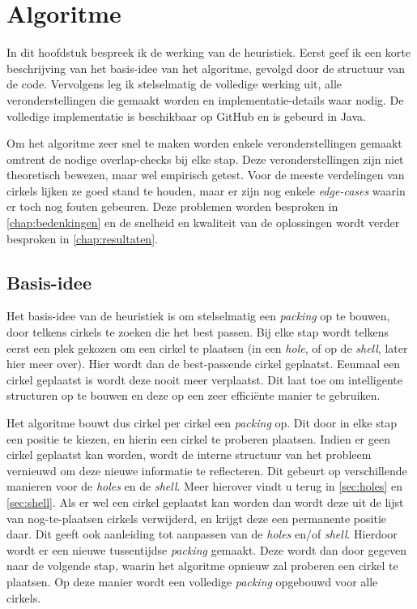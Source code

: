 \documentclass[12pt,a4paper,oneside]{book}
\begin{document}
\chapter{Algoritme} \label{chap:algoritme}

In dit hoofdstuk bespreek ik de werking van de heuristiek.
Eerst geef ik een korte beschrijving van het basis-idee van het algoritme, gevolgd door de structuur van de code.
Vervolgens leg ik stelselmatig de volledige werking uit, alle veronderstellingen die gemaakt worden en implementatie-details waar nodig.
De volledige implementatie is beschikbaar op GitHub \cite{circle-packing-github} en is gebeurd in Java.

Om het algoritme zeer snel te maken worden enkele veronderstellingen gemaakt omtrent de nodige overlap-checks bij elke stap.
Deze veronderstellingen zijn niet theoretisch bewezen, maar wel empirisch getest.
Voor de meeste verdelingen van cirkels lijken ze goed stand te houden, maar er zijn nog enkele \textit{edge-cases} waarin er toch nog fouten gebeuren.
Deze problemen worden besproken in \autoref{chap:bedenkingen} en de snelheid en kwaliteit van de oplossingen wordt verder besproken in \autoref{chap:resultaten}.

\section{Basis-idee}

Het basis-idee van de heuristiek is om stelselmatig een \textit{packing} op te bouwen, door telkens cirkels te zoeken die het best passen.
Bij elke stap wordt telkens eerst een plek gekozen om een cirkel te plaatsen (in een \textit{hole}, of op de \textit{shell}, later hier meer over).
Hier wordt dan de best-passende cirkel geplaatst.
Eenmaal een cirkel geplaatst is wordt deze nooit meer verplaatst.
Dit laat toe om intelligente structuren op te bouwen en deze op een zeer efficiënte manier te gebruiken.

Het algoritme bouwt dus cirkel per cirkel een \textit{packing} op.
Dit door in elke stap een positie te kiezen, en hierin een cirkel te proberen plaatsen.
Indien er geen cirkel geplaatst kan worden, wordt de interne structuur van het probleem vernieuwd om deze nieuwe informatie te reflecteren.
Dit gebeurt op verschillende manieren voor de \textit{holes} en de \textit{shell}.
Meer hierover vindt u terug in \autoref{sec:holes} en \autoref{sec:shell}.
Als er wel een cirkel geplaatst kan worden dan wordt deze uit de lijst van nog-te-plaatsen cirkels verwijderd, en krijgt deze een permanente positie daar.
Dit geeft ook aanleiding tot aanpassen van de \textit{holes} en/of \textit{shell}.
Hierdoor wordt er een nieuwe tussentijdse \textit{packing} gemaakt.
Deze wordt dan door gegeven naar de volgende stap, waarin het algoritme opnieuw zal proberen een cirkel te plaatsen.
Op deze manier wordt een volledige \textit{packing} opgebouwd voor alle cirkels.
\end{document}
